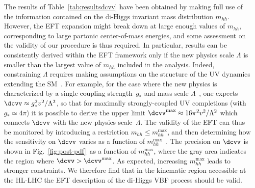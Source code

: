 The results of Table~\ref{tab:resultsdcvv}
have been obtained by making full use of the information
contained on the di-Higgs invariant mass distribution $m_{hh}$.
%
However, the EFT expansion might break down at large enough values of
$m_{hh}$, corresponding to large partonic center-of-mass energies,
and some assessment on the validity of our procedure is thus required.
%
In particular, results can be consistently derived within the EFT
framework only if the new physics scale $\Lambda$ is smaller than the largest value of $m_{hh}$ included in the analysis.
%
Indeed, constraining $\Lambda$
requires making assumptions on the structure of the UV dynamics extending the SM~\cite{Contino:2016jqw}.
%
For example, for the case where the new physics is characterized by a single 
coupling strength~$g_*$ and mass scale $\Lambda$~\cite{Giudice:2007fh}, one expects $
\dcvv \approx g_*^2 v^2/\Lambda^2$, so that
for maximally strongly-coupled UV completions (with $g_* \simeq 4\pi$)
it is possible to derive the upper limit
$\dcvv^\text{max} \approx 16\pi^2 v^2/\Lambda^2$
which connects $\dcvv$ with the new physics scale~$\Lambda$.
%
The validity of the EFT can thus be monitored
by introducing a restriction $m_{hh} \leq  m_{hh}^\text{max}$, and
then determining how the sensitivity on $\dcvv$ varies as a function of 
$m_{hh}^\text{max}$~\cite{Contino:2016jqw}.
%
The precision on ${\dcvv}$
is shown in Fig.~\ref{fig:post-pdf}~as a function of  $m_{hh}^{\max}$,
where the gray area indicates the region where $\dcvv > \dcvv^\text{max}$.
%
As expected, increasing $m_{hh}^\text{max}$
leads to stronger constraints.
%
We therefore find that in the kinematic region accessible at the HL-LHC the
EFT description of the di-Higgs VBF process should be valid.
